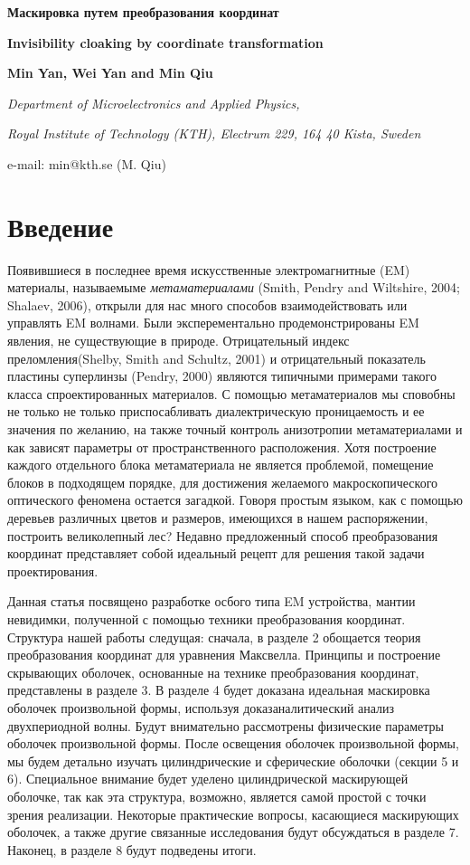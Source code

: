 \documentclass[12pt,a4paper]{article}
\newcommand{\tit}[1]{\begin{center}{\bf{\Large #1}}\end{center}}
\newcommand{\aut}[1]{\centerline{{\bf #1}}}
\newcommand{\cityorg}[1]{\centerline{\it #1}}
\newcommand{\email}[1]{\centerline{{\small e-mail: #1}}\vspace{\baselineskip}}
\begin{document}
\sloppy

 \tit{Маскировка путем преобразования координат}
 \tit{Invisibility cloaking by coordinate transformation}
 \aut{Min Yan, Wei Yan and Min Qiu}
 \cityorg{Department of Microelectronics and Applied Physics,}
 \cityorg{Royal Institute of Technology (KTH), Electrum 229, 164 40 Kista, Sweden}
 \email{min@kth.se (M. Qiu)}

\section{Введение}
Появившиеся в последнее время искусственные электромагнитные (EM) материалы, называемыме 
\textit{метаматериалами} (Smith, Pendry and Wiltshire, 2004; Shalaev, 2006), открыли для нас
много способов взаимодействовать или управлять EM волнами. Были эксперементально продемонстрированы EM
явления, не существующие в природе. Отрицательный индекс преломления(Shelby, Smith and Schultz, 2001)
и отрицательный показатель пластины суперлинзы (Pendry, 2000) являются типичными примерами такого класса
спроектированных материалов. С помощью метаматериалов мы сповобны не только не только приспосабливать 
диалектрическую проницаемость и ее значения по желанию, на также точный контроль анизотропии 
метаматериалами и как зависят параметры от пространственного расположения. Хотя построение каждого 
отдельного блока метаматериала не является проблемой, помещение блоков в подходящем порядке, для 
достижения желаемого макроскопического оптического феномена остается загадкой. Говоря простым языком,
как с помощью деревьев различных цветов и размеров, имеющихся в нашем распоряжении, построить великолепный
лес? Недавно предложенный способ преобразования координат представляет собой идеальный рецепт для
решения такой задачи проектирования.

Данная статья посвящено разработке осбого типа EM устройства, мантии невидимки, полученной с помощью
техники преобразования координат. Структура нашей работы следущая: сначала, в разделе 2 обощается
теория преобразования координат для уравнения Максвелла. Принципы и построение скрывающих оболочек,
основанные на технике преобразования координат, представлены в разделе 3. В разделе 4 будет доказана
идеальная маскировка оболочек произвольной формы, используя доказаналитический анализ двухпериодной волны.
Будут внимательно рассмотрены физические параметры оболочек произвольной формы. После освещения
оболочек произвольной формы, мы будем детально изучать цилиндрические и сферические оболочки 
(секции 5 и 6). Специальное внимание будет уделено цилиндрической маскирующей оболочке, так как эта 
структура, возможно, является самой простой с точки зрения реализации. Некоторые практические вопросы,
касающиеся маскирующих оболочек, а также другие связанные исследования будут обсуждаться в разделе 7.
Наконец, в разделе 8 будут подведены итоги.
\end{document}
